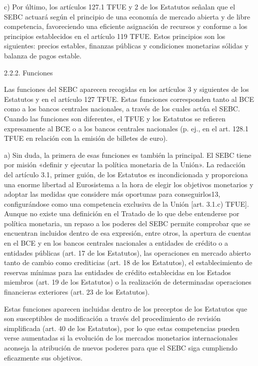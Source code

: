 \documentclass[10pt,a4paper]{article}
\begin{document}
c) Por último, los artículos 127.1 TFUE y 2 de los Estatutos señalan que el SEBC actuará según el principio de una economía de mercado abierta y de libre competencia, favoreciendo una eficiente asignación de recursos y conforme a los principios establecidos en el artículo 119 TFUE. Estos principios son los siguientes: precios estables, finanzas públicas y condiciones monetarias sólidas y balanza de pagos estable.


2.2.2. Funciones

Las funciones del SEBC aparecen recogidas en los artículos 3 y siguientes de los Estatutos y en el artículo 127 TFUE. Estas funciones corresponden tanto al BCE como a los bancos centrales nacionales, a través de los cuales actúa el SEBC. Cuando las funciones son diferentes, el TFUE y los Estatutos se refieren expresamente al BCE o a los bancos centrales nacionales (p. ej., en el art. 128.1 TFUE en relación con la emisión de billetes de euro).


a) Sin duda, la primera de esas funciones es también la principal. El SEBC tiene por misión «definir y ejecutar la política monetaria de la Unión». La redacción del artículo 3.1, primer guión, de los Estatutos es incondicionada y proporciona una enorme libertad al Eurosistema a la hora de elegir los objetivos monetarios y adoptar las medidas que considere más oportunas para conseguirlos13, configurándose como una competencia exclusiva de la Unión [art. 3.1.c) TFUE]. Aunque no existe una definición en el Tratado de lo que debe entenderse por política monetaria, un repaso a los poderes del SEBC permite comprobar que se encuentran incluidos  dentro de esa expresión, entre otros, la apertura de cuentas en el BCE y en los bancos centrales nacionales a entidades de crédito o a entidades públicas (art. 17 de los Estatutos), las operaciones en mercado abierto tanto de cambio como crediticias (art. 18 de los Estatutos), el establecimiento de reservas mínimas para las entidades de crédito establecidas en los Estados miembros (art. 19 de los Estatutos) o la realización de determinadas operaciones  financieras exteriores (art. 23 de los Estatutos).

Estas funciones aparecen incluidas dentro de los preceptos de los Estatutos que son susceptibles de modificación a través del procedimiento de revisión simplificada (art. 40 de los Estatutos), por lo que estas competencias pueden verse aumentadas si la evolución de los mercados monetarios internacionales aconseja la atribución de nuevos poderes para que el SEBC siga cumpliendo eficazmente sus objetivos.
\end{document}
